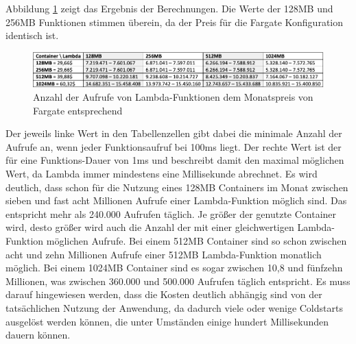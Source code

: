 Abbildung \ref{fig:lambda-max-invocations} zeigt das Ergebnis der Berechnungen. Die Werte der 128MB und 256MB Funktionen stimmen überein, da der Preis für die Fargate Konfiguration identisch ist.

\begin{figure}[H]
    \includegraphics[width=\textwidth]{img/lambda-max-invocations.png}
    \caption[Anzahl der Aufrufe von Lambda-Funktionen dem Monatspreis von Fargate entsprechend]{Anzahl der Aufrufe von Lambda-Funktionen dem Monatspreis von Fargate entsprechend}
    \label{fig:lambda-max-invocations}
\end{figure}

Der jeweils linke Wert in den Tabellenzellen gibt dabei die minimale Anzahl der Aufrufe an, wenn jeder Funktionsaufruf bei 100ms liegt. Der rechte Wert ist der für eine Funktions-Dauer von 1ms und beschreibt damit den maximal möglichen Wert, da Lambda immer mindestens eine Millisekunde abrechnet\cite{noauthor_lambda_nodate}. Es wird deutlich, dass schon für die Nutzung eines 128MB Containers im Monat zwischen sieben und fast acht Millionen Aufrufe einer Lambda-Funktion möglich sind. Das entspricht mehr als 240.000 Aufrufen täglich. Je größer der genutzte Container wird, desto größer wird auch die Anzahl der mit einer gleichwertigen Lambda-Funktion möglichen Aufrufe. Bei einem 512MB Container sind so schon zwischen acht und zehn Millionen Aufrufe einer 512MB Lambda-Funktion monatlich möglich. Bei einem 1024MB Container sind es sogar zwischen 10,8 und fünfzehn Millionen, was zwischen 360.000 und 500.000 Aufrufen täglich entspricht.
Es muss darauf hingewiesen werden, dass die Kosten deutlich abhängig sind von der tatsächlichen Nutzung der Anwendung, da dadurch viele oder wenige Coldstarts ausgelöst werden können, die unter Umständen einige hundert Millisekunden dauern können.